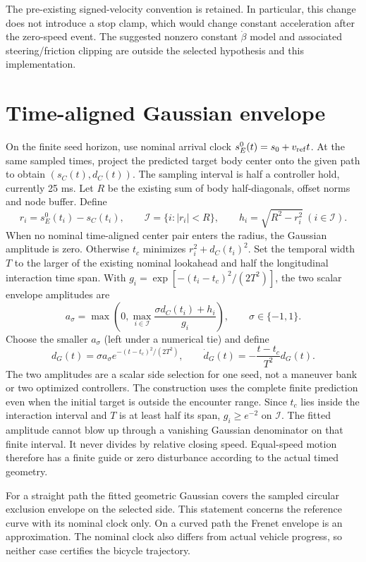 \documentclass[11pt]{article}
\begin{document}
The pre-existing signed-velocity convention is retained. In particular, this
change does not introduce a stop clamp, which would change constant
acceleration after the zero-speed event. The suggested nonzero constant
$\dot\beta$ model and associated steering/friction clipping are outside the
selected hypothesis and this implementation.

\section{Time-aligned Gaussian envelope}
On the finite seed horizon, use nominal arrival clock
$s_E^0(t)=s_0+v_{\rm ref}t$. At the same sampled times, project the predicted
target body center onto the given path to obtain $(s_C(t),d_C(t))$. The
sampling interval is half a controller hold, currently 25 ms. Let $R$ be the
existing sum of body half-diagonals, offset norms and node buffer. Define
\[
 r_i=s_E^0(t_i)-s_C(t_i),\qquad
 \mathcal I=\{i:|r_i|<R\},\qquad h_i=\sqrt{R^2-r_i^2}\ (i\in\mathcal I).
\]
When no nominal time-aligned center pair enters the radius, the Gaussian
amplitude is zero. Otherwise $t_c$ minimizes $r_i^2+d_C(t_i)^2$. Set the
temporal width $T$ to the larger of the existing nominal lookahead and half
the longitudinal interaction time span. With
$g_i=\exp[-(t_i-t_c)^2/(2T^2)]$, the two scalar envelope amplitudes are
\[
 a_\sigma=\max\left(0,\max_{i\in\mathcal I}
       \frac{\sigma d_C(t_i)+h_i}{g_i}\right),\qquad \sigma\in\{-1,1\}.
\]
Choose the smaller $a_\sigma$ (left under a numerical tie) and define
\[
 d_G(t)=\sigma a_\sigma e^{-(t-t_c)^2/(2T^2)},\qquad
 \dot d_G(t)=-\frac{t-t_c}{T^2}d_G(t).
\]
The two amplitudes are a scalar side selection for one seed, not a maneuver
bank or two optimized controllers. The construction uses the complete finite
prediction even when the initial target is outside the encounter range.
Since $t_c$ lies inside the interaction interval and $T$ is at least half
its span, $g_i\ge e^{-2}$ on $\mathcal I$. The fitted amplitude cannot blow
up through a vanishing Gaussian denominator on that finite interval.
It never divides by relative closing speed. Equal-speed motion therefore has
a finite guide or zero disturbance according to the actual timed geometry.

For a straight path the fitted geometric Gaussian covers the sampled
circular exclusion envelope on the selected side. This statement concerns
the reference curve with its nominal clock only. On a curved path the Frenet
envelope is an approximation. The nominal clock also differs from actual
vehicle progress, so neither case certifies the bicycle trajectory.
\end{document}
